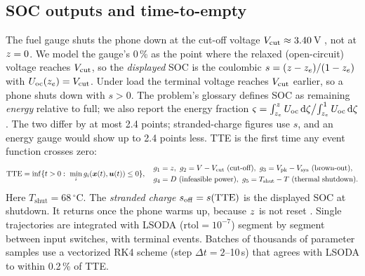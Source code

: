 \subsection{SOC outputs and time-to-empty}\label{sec:events}
The fuel gauge shuts the phone down at the cut-off voltage $V_{\mathrm{cut}}\approx3.40$\,V \cite{QC-FG,LEE20}, not at
$z=0$. We model the gauge's 0\,\% as the point where the relaxed (open-circuit) voltage reaches $V_{\mathrm{cut}}$, so the
\emph{displayed} SOC is the coulombic $s=(z-z_e)/(1-z_e)$ with $U_{\mathrm{oc}}(z_e)=V_{\mathrm{cut}}$. Under load the
terminal voltage reaches $V_{\mathrm{cut}}$ earlier, so a phone shuts down with $s>0$. The problem's glossary defines SOC as
remaining \emph{energy} relative to full; we also report the energy fraction
$\varsigma=\int_{z_e}^{z}U_{\mathrm{oc}}\,\mathrm{d}\zeta\big/\!\int_{z_e}^{1}U_{\mathrm{oc}}\,\mathrm{d}\zeta$. The two differ by at most
2.4 points; stranded-charge figures use $s$, and an energy gauge would show up to 2.4 points less. TTE is the
first time any event function crosses zero:
\begin{equation}
  \TTE=\inf\{t>0:\ \min_i g_i(\bm x(t),\bm u(t))\le0\},\quad
  \begin{aligned}
  &g_1=\soc,\ g_2=V-\Vcut\ \text{(cut-off)},\ g_3=V_{\mathrm{pk}}-V_{\mathrm{sys}}\ \text{(brown-out)},\\
  &g_4=D\ \text{(infeasible power)},\ g_5=T_{\mathrm{shut}}-T\ \text{(thermal shutdown)}.
  \end{aligned}\label{eq:tte}
\end{equation}
Here $T_{\mathrm{shut}}=68\,^\circ$C. The \emph{stranded charge} $s_{\mathrm{off}}=s(\mathrm{TTE})$ is the displayed SOC at shutdown. It returns once the phone
warms up, because $z$ is not reset \cite{LEE20}. Single trajectories are integrated with LSODA
($\mathrm{rtol}=10^{-7}$) segment by segment between input switches, with terminal events. Batches of thousands
of parameter samples use a vectorized RK4 scheme (step $\Delta t=2$--10\,s) that agrees with LSODA to within
0.2\,\% of TTE.
